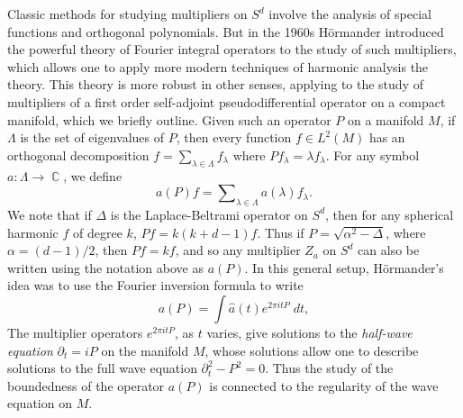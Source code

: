 \documentclass[11pt]{article}
\DeclareMathOperator{\RR}{\mathbb{R}}
\DeclareMathOperator{\CC}{\mathbb{C}}
\begin{document}
Classic methods for studying multipliers on $S^d$ involve the analysis of special functions and orthogonal polynomials. But in the 1960s H\"{o}rmander introduced the powerful theory of Fourier integral operators to the study of such multipliers, which allows one to apply more modern techniques of harmonic analysis the theory. This theory is more robust in other senses, applying to the study of multipliers of a first order self-adjoint pseudodifferential operator on a compact manifold, which we briefly outline. Given such an operator $P$ on a manifold $M$, if $\Lambda$ is the set of eigenvalues of $P$, then every function $f \in L^2(M)$ has an orthogonal decomposition $f = \sum_{\lambda \in \Lambda} f_\lambda$ where $Pf_\lambda = \lambda f_\lambda$. For any symbol $a: \Lambda \to \CC$, we define
%
\[ a(P) f = \sum\nolimits_{\lambda \in \Lambda} a(\lambda) f_\lambda. \]
%
We note that if $\Delta$ is the Laplace-Beltrami operator on $S^d$, then for any spherical harmonic $f$ of degree $k$, $Pf = k(k+d-1) f$. Thus if $P = \sqrt{ \alpha^2 - \Delta }$, where $\alpha = (d-1)/2$, then $Pf = kf$, and so any multiplier $Z_a$ on $S^d$ can also be written using the notation above as $a(P)$. In this general setup, H\"{o}rmander's idea was to use the Fourier inversion formula to write
%
\[ a(P) = \int \widehat{a}(t) e^{2 \pi i t P}\; dt, \]
%
The multiplier operators $e^{2 \pi i t P}$, as $t$ varies, give solutions to the \emph{half-wave equation} $\partial_t = i P$ on the manifold $M$, whose solutions allow one to describe solutions to the full wave equation $\partial_t^2 - P^2 = 0$. Thus the study of the boundedness of the operator $a(P)$ is connected to the regularity of the wave equation on $M$. %
\end{document}
